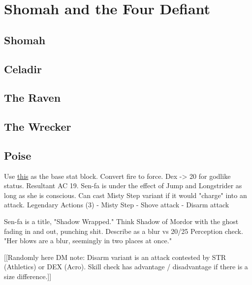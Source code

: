 \section{Shomah and the Four Defiant}\label{sec:celadir}
\subsection{Shomah}

\subsection{Celadir}

\subsection{The Raven}


\subsection{The Wrecker}

\subsection{Poise}

Use \href{https://i.imgur.com/HIvPzSj.jpg}{this} as the base stat block.
Convert fire to force.
Dex -> 20 for godlike status.
Resultant AC 19.
Sen-fa is under the effect of Jump and Longstrider as long as she is conscious.
Can cast Misty Step variant if it would "charge" into an attack.
Legendary Actions (3)
- Misty Step
- Shove attack
- Disarm attack

Sen-fa is a title, "Shadow Wrapped."
Think Shadow of Mordor with the ghost fading in and out, punching shit.
Describe as a blur vs 20/25 Perception check.
"Her blows are a blur, seemingly in two places at once."

[[Randomly here DM note:
Disarm variant is an attack contested by STR (Athletics) or DEX (Acro).
Skill check has advantage / disadvantage if there is a size difference.]]


